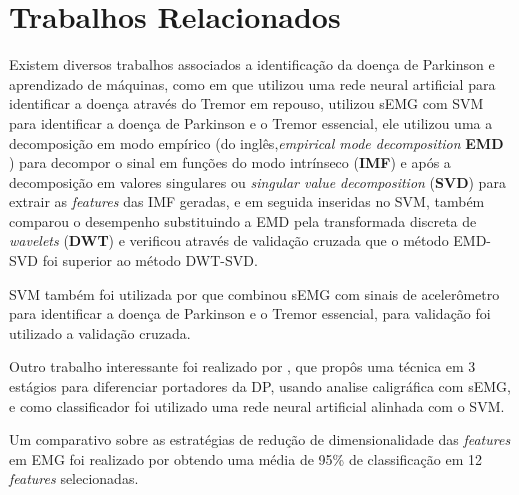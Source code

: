 \chapter[TrabalhosRelacionados]{Trabalhos Relacionados}

Existem diversos trabalhos associados a identificação da doença de Parkinson e aprendizado de máquinas, como em \cite{camara2015resting} que utilizou uma rede neural artificial para identificar a doença através do Tremor em repouso,  utilizou sEMG com SVM para identificar a doença de Parkinson e o Tremor essencial, ele utilizou uma a decomposição em modo empírico (do inglês,\textit{empirical mode decomposition} \textbf{EMD} ) para decompor o sinal em funções do modo intrínseco (\textbf{IMF}) e após a decomposição em valores singulares ou \textit{singular value decomposition} (\textbf{SVD}) para extrair as \textit{features} das IMF geradas, e em seguida inseridas no SVM,  também comparou o desempenho substituindo a EMD pela transformada discreta de \textit{wavelets} (\textbf{DWT})  e verificou através de validação cruzada que o método EMD-SVD foi superior ao método DWT-SVD.

SVM também foi utilizada por \cite{kugler2013automated} que combinou sEMG com sinais de acelerômetro para identificar a doença de Parkinson e o Tremor essencial, para validação foi utilizado a validação cruzada.

Outro trabalho interessante foi realizado por \cite{loconsole2018model}, que propôs uma técnica em 3 estágios para diferenciar portadores da DP, usando analise caligráfica com sEMG, e como classificador foi utilizado uma rede neural artificial alinhada com o SVM.

Um comparativo sobre as estratégias de redução de dimensionalidade das \textit{features} em EMG foi realizado por \cite{liu2014feature} obtendo uma média de 95\% de classificação em 12 \textit{features} selecionadas. 